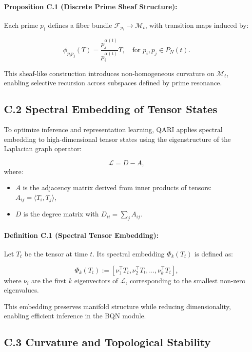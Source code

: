 \documentclass[12pt]{article}
\begin{document}
\begin{itemize}
\paragraph{Proposition C.1 (Discrete Prime Sheaf Structure):}
Each prime \(p_i\) defines a fiber bundle \(\mathcal{F}_{p_i} \to \mathcal{M}_t\), with transition maps induced by:

\[
\phi_{p_i p_j}(T) = \frac{p_j^{\alpha(t)}}{p_i^{\alpha(t)}} T, \quad \text{for } p_i, p_j \in P_N(t).
\]

This sheaf-like construction introduces non-homogeneous curvature on \(\mathcal{M}_t\), enabling selective recursion across subspaces defined by prime resonance.

\subsection*{C.2 Spectral Embedding of Tensor States}

To optimize inference and representation learning, QARI applies spectral embedding to high-dimensional tensor states using the eigenstructure of the Laplacian graph operator:

\[
\mathcal{L} = D - A,
\]
where:
\begin{itemize}
    \item \(A\) is the adjacency matrix derived from inner products of tensors: \(A_{ij} = \langle T_i, T_j \rangle\),
    \item \(D\) is the degree matrix with \(D_{ii} = \sum_j A_{ij}\).
\end{itemize}

\paragraph{Definition C.1 (Spectral Tensor Embedding):}
Let \(T_t\) be the tensor at time \(t\). Its spectral embedding \(\Phi_k(T_t)\) is defined as:

\[
\Phi_k(T_t) := \left[ \nu_1^\top T_t, \nu_2^\top T_t, \dots, \nu_k^\top T_t \right],
\]
where \(\nu_i\) are the first \(k\) eigenvectors of \(\mathcal{L}\), corresponding to the smallest non-zero eigenvalues.

This embedding preserves manifold structure while reducing dimensionality, enabling efficient inference in the BQN module.

\subsection*{C.3 Curvature and Topological Stability}


\end{itemize}
\end{document}
